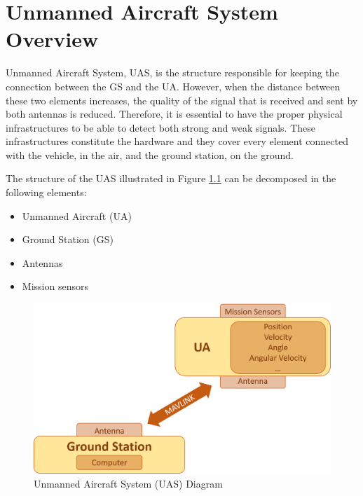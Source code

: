 \chapter{Unmanned Aircraft System Overview}\label{ch:uas}

Unmanned Aircraft System, UAS, is the structure responsible for keeping the connection between the GS and the UA. However, when the distance between these two elements increases, the quality of the signal that is received and sent by both antennas is reduced. Therefore, it is essential to have the proper physical infrastructures to be able to detect both strong and weak signals. These infrastructures constitute the hardware and they cover every element connected with the vehicle, in the air, and the ground station, on the ground.


The structure of the UAS illustrated in Figure \ref{fig:uas} can be decomposed in the following elements:
\begin{itemize}
	\item Unmanned Aircraft (UA)
	\item Ground Station (GS)
	\item Antennas
	\item Mission sensors
\end{itemize}

\begin{figure}[H]
	\centering
	\includegraphics[scale=0.4]{figures/uas.png}
	\caption{Unmanned Aircraft System (UAS) Diagram}
	\label{fig:uas}
\end{figure}

